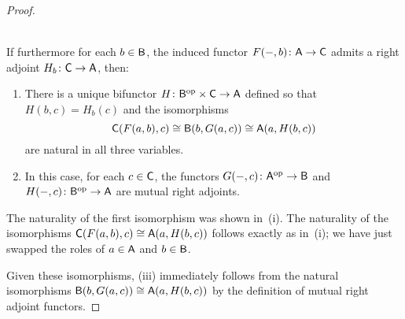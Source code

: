 \documentclass[../../solutions]{subfiles}
\begin{document}
\begin{proof}
  \begin{proposition}[continued]
    \leavevmode\\
    If furthermore for each $b\in{\mathsf{B}}$, the induced functor
    ${F(-,b)}\colon{{\mathsf{A}}}\to{{\mathsf{C}}}$ admits a right adjoint
    ${H_b}\colon{{\mathsf{C}}}\to{{\mathsf{A}}}$, then:
    \begin{enumerate}[label=(\roman*), start=2]
    \item There is a unique bifunctor
      ${H}\colon{{\mathsf{B}}^{\mathrm{op}}\times{\mathsf{C}}}\to{{\mathsf{A}}}$ defined so that
      $H(b,c)=H_b(c)$ and the isomorphisms
      $${\mathsf{C}}(F(a,b),c)\cong {\mathsf{B}}(b,G(a,c)) \cong {\mathsf{A}}(a,H(b,c))$$
      are natural in all three variables.
    \item In this case, for each $c\in{\mathsf{C}}$, the functors
      ${G(-,c)}\colon{{\mathsf{A}}^{\mathrm{op}}}\to{{\mathsf{B}}}$ and ${H(-,c)}\colon{{\mathsf{B}}^{\mathrm{op}}}\to{{\mathsf{A}}}$
      are mutual right adjoints.
    \end{enumerate}
  \end{proposition}
  \popthm

  The naturality of the first isomorphism was shown in~(i).  The
  naturality of the isomorphisms ${\mathsf{C}}(F(a,b),c)\cong {\mathsf{A}}(a,H(b,c))$
  follows exactly as in~(i); we have just swapped the roles of
  $a\in{\mathsf{A}}$ and $b\in{\mathsf{B}}$.

  Given these isomorphisms, (iii) immediately follows from the natural
  isomorphisms ${\mathsf{B}}(b,G(a,c)) \cong {\mathsf{A}}(a,H(b,c))$ by the definition
  of mutual right adjoint functors.
\end{proof}
\end{document}
